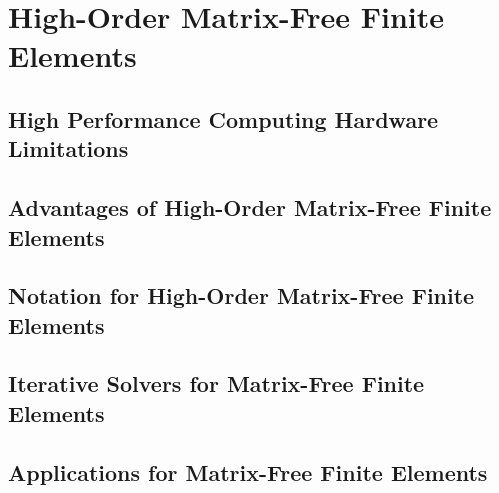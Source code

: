 \chapter{High-Order Matrix-Free Finite Elements}\label{ch:HighOrderFEM}


\section{High Performance Computing Hardware Limitations}\label{sec:highorderwhy}


\section{Advantages of High-Order Matrix-Free Finite Elements}\label{sec:highorderbenefits}


\section{Notation for High-Order Matrix-Free Finite Elements}\label{sec:highordernotation}


\section{Iterative Solvers for Matrix-Free Finite Elements}\label{sec:highordersolvers}


\section{Applications for Matrix-Free Finite Elements}\label{sec:libceedapplications}

